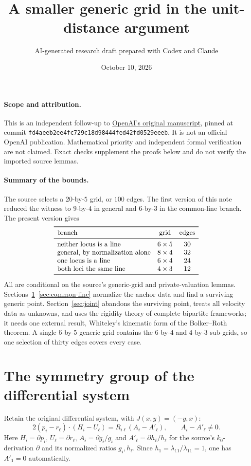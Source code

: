 \documentclass[11pt]{article}
\title{A smaller generic grid in the unit-distance argument}
\author{AI-generated research draft prepared with Codex and Claude}
\date{October 10, 2026}
\theoremstyle{remark}
\begin{document}
\maketitle
\paragraph{Scope and attribution.}
This is an independent follow-up to
\href{https://github.com/openai/math/tree/fd4aeeb2ee4fc729c18d98444fed42fd0529eeeb/preprints/A-power-saving-for-planar-unit-distances-September-23-2026}{OpenAI's original manuscript},
pinned at commit \texttt{fd4aeeb2ee4fc729c18d98444fed42fd0529eeeb}.
It is not an official OpenAI publication. Mathematical priority and
independent formal verification are not claimed. Exact checks supplement
the proofs below and do not verify the imported source lemmas.

\paragraph{Summary of the bounds.}
The source selects a $20$-by-$5$ grid, or $100$ edges. The first
version of this note reduced the witness to $9$-by-$4$ in general and
$6$-by-$3$ in the common-line branch. The present version gives
\[
 \begin{array}{lcc}
 \toprule
 \text{branch} & \text{grid} & \text{edges}\\
 \midrule
 \text{neither locus is a line} & 6\times5 & 30\\
 \text{general, by normalization alone} & 8\times4 & 32\\
 \text{one locus is a line} & 6\times4 & 24\\
 \text{both loci the same line} & 4\times3 & 12\\
 \bottomrule
 \end{array}
\]
All are conditional on the source's generic-grid and private-valuation
lemmas. Sections~\ref{sec:symmetries}--\ref{sec:common-line} normalize
the anchor data and find a surviving generic point.
Section~\ref{sec:joint} abandons the surviving point, treats all
velocity data as unknowns, and uses the rigidity theory of complete
bipartite frameworks; it needs one external result, Whiteley's
kinematic form of the Bolker--Roth theorem. A single $6$-by-$5$
generic grid contains the $6$-by-$4$ and $4$-by-$3$ sub-grids, so one
selection of thirty edges covers every case.

\section{The symmetry group of the differential system}
\label{sec:symmetries}
Retain the original differential system, with $J(x,y)=(-y,x)$:
\begin{equation}\label{eq:system}
 2(p_i-r_\ell)\cdot(H_i-U_\ell)
   =R_{i\ell}(A_i-A'_\ell),\qquad A_i-A'_\ell\ne0 .
\end{equation}
Here $H_i=\partial p_i$, $U_\ell=\partial r_\ell$,
$A_i=\partial g_i/g_i$ and $A'_\ell=\partial h_\ell/h_\ell$ for the
source's $k_0$-derivation $\partial$ and its normalized ratios
$g_i,h_\ell$. Since $h_1=\lambda_{11}/\lambda_{11}=1$, one has
$A'_1=0$ automatically.
\end{document}
